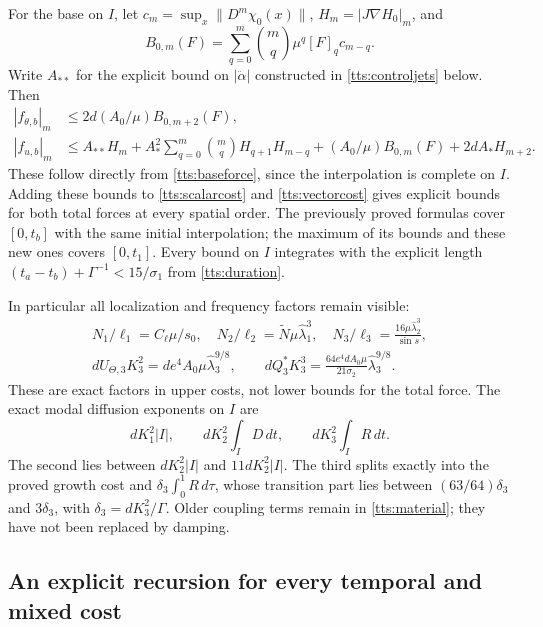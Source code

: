 For the base on $I$, let
$c_m=\sup_x\|D^m\chi_0(x)\|$, $H_m=|J\nabla H_0|_m$, and
\[
 B_{0,m}(F)=\sum_{q=0}^m\binom mq\mu^q[F]_qc_{m-q}.
\]
Write $A_{**}$ for the explicit bound on $|\ddot\alpha|$
constructed in \eqref{tts:controljets} below. Then
\begin{align}\label{tts:basecost}
 |f_{\theta,b}|_m&\leq2d(A_0/\mu)B_{0,m+2}(F),\nonumber\\
 |f_{u,b}|_m&\leq A_{**}H_m+
 A_*^2\sum_{q=0}^m\binom mq H_{q+1}H_{m-q}
 +(A_0/\mu)B_{0,m}(F)+2dA_*H_{m+2}.
\end{align}
These follow directly from \eqref{tts:baseforce}, since the
interpolation is complete on $I$. Adding these bounds to
\eqref{tts:scalarcost} and \eqref{tts:vectorcost} gives explicit
bounds for both total forces at every spatial order. The previously
proved formulas cover $[0,t_b]$ with the same initial interpolation;
the maximum of its bounds and these new ones covers $[0,t_1]$.
Every bound on $I$ integrates with the explicit length
$(t_a-t_b)+\Gamma^{-1}<15/\sigma_1$ from \eqref{tts:duration}.

In particular all localization and frequency factors remain visible:
\begin{equation}\label{tts:frequencycost}
 \begin{gathered}
 N_1/\ell_1=C_\ell\mu/s_0,\quad
 N_2/\ell_2=\widetilde N\mu\widehat\lambda_1^3,\quad
 N_3/\ell_3=\frac{16\mu\widehat\lambda_2^3}{\sin s},\\
 dU_{\Theta,3}K_3^2
       =de^4A_0\mu\widehat\lambda_3^{9/8},\qquad
 dQ_3^*K_3^3
       =\frac{64e^4dA_0\mu}{21\sigma_2}
                                      \widehat\lambda_3^{9/8}.
 \end{gathered}
\end{equation}
These are exact factors in upper costs, not lower bounds for the
total force. The exact modal diffusion exponents on $I$ are
\begin{equation}\label{tts:exponents}
 dK_1^2|I|,\qquad dK_2^2\int_I D\,dt,\qquad
 dK_3^2\int_I R\,dt.
\end{equation}
The second lies between $dK_2^2|I|$ and $11dK_2^2|I|$.
The third splits exactly into the proved growth cost and
$\delta_3\int_0^1R\,d\tau$, whose transition part lies between
$(63/64)\delta_3$ and $3\delta_3$, with
$\delta_3=dK_3^2/\Gamma$. Older coupling terms remain in
\eqref{tts:material}; they have not been replaced by damping.

\subsection{An explicit recursion for every temporal and mixed cost}

